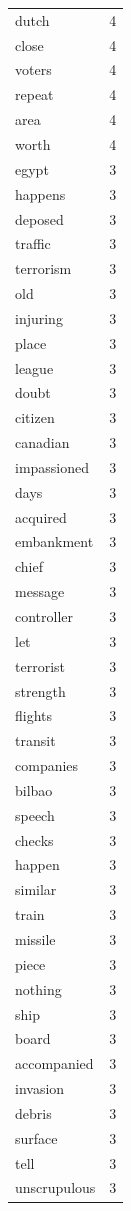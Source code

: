 \begin{tabular}{lr}
dutch & 4 \\
close & 4 \\
voters & 4 \\
repeat & 4 \\
area & 4 \\
worth & 4 \\
egypt & 3 \\
happens & 3 \\
deposed & 3 \\
traffic & 3 \\
terrorism & 3 \\
old & 3 \\
injuring & 3 \\
place & 3 \\
league & 3 \\
doubt & 3 \\
citizen & 3 \\
canadian & 3 \\
impassioned & 3 \\
days & 3 \\
acquired & 3 \\
embankment & 3 \\
chief & 3 \\
message & 3 \\
controller & 3 \\
let & 3 \\
terrorist & 3 \\
strength & 3 \\
flights & 3 \\
transit & 3 \\
companies & 3 \\
bilbao & 3 \\
speech & 3 \\
checks & 3 \\
happen & 3 \\
similar & 3 \\
train & 3 \\
missile & 3 \\
piece & 3 \\
nothing & 3 \\
ship & 3 \\
board & 3 \\
accompanied & 3 \\
invasion & 3 \\
debris & 3 \\
surface & 3 \\
tell & 3 \\
unscrupulous & 3 \\

\end{tabular}
